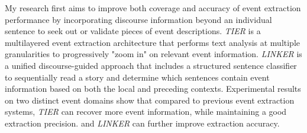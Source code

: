 My research first aims to improve both coverage and accuracy of event extraction performance 
by incorporating discourse information 
beyond an individual sentence 
to seek out or validate pieces of event descriptions. 
{\it TIER} is a multilayered event extraction architecture 
that performs text analysis at multiple granularities 
to progressively "zoom in" on relevant event information. 
{\it LINKER} is a unified discourse-guided approach 
that includes a structured sentence classifier 
to sequentially read a
story and determine which sentences contain event
information based on both the local and preceding contexts. 
Experimental results on two distinct event domains 
show that compared to previous 
event extraction systems, {\it TIER} 
can recover more event information, while maintaining a good extraction precision.
and {\it LINKER} 
can further improve extraction accuracy.  

